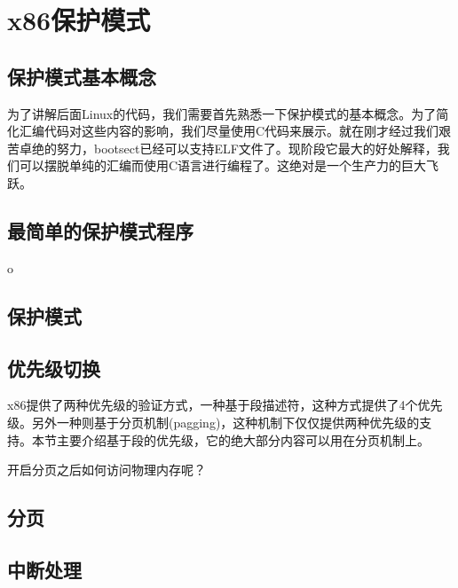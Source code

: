 \chapter{x86保护模式}
\section{保护模式基本概念}
为了讲解后面Linux的代码，我们需要首先熟悉一下保护模式的基本概念。为了简化汇编代码对这些内容的影响，我们尽量使用C代码来展示。就在刚才经过我们艰苦卓绝的努力，bootsect已经可以支持ELF文件了。现阶段它最大的好处解释，我们可以摆脱单纯的汇编而使用C语言进行编程了。这绝对是一个生产力的巨大飞跃。

\section{最简单的保护模式程序}

o\section{保护模式}

\section{优先级切换}
x86提供了两种优先级的验证方式，一种基于段描述符，这种方式提供了4个优先级。另外一种则基于分页机制(pagging)，这种机制下仅仅提供两种优先级的支持。本节主要介绍基于段的优先级，它的绝大部分内容可以用在分页机制上。


\parbox{3cm}{开启分页之后如何访问物理内存呢？}


\section{分页}
\section{中断处理}


